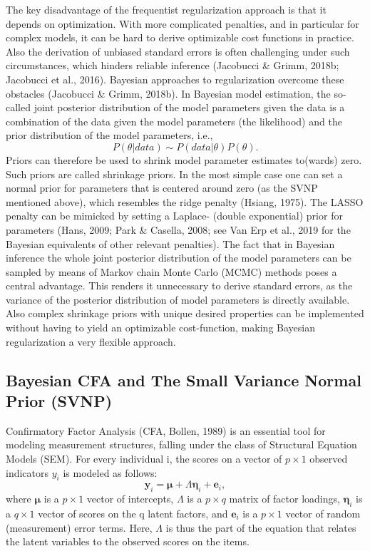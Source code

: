 \documentclass[
  man, donotrepeattitle,floatsintext]{apa6}
\begin{document}
The key disadvantage of the frequentist regularization approach is that
it depends on optimization. With more complicated penalties, and in
particular for complex models, it can be hard to derive optimizable cost
functions in practice. Also the derivation of unbiased standard errors
is often challenging under such circumstances, which hinders reliable
inference (Jacobucci \& Grimm, 2018b; Jacobucci et al., 2016).
Bayesian approaches to regularization overcome these obstacles
(Jacobucci \& Grimm, 2018b). In Bayesian model estimation, the
so-called joint posterior distribution of the model parameters given the
data is a combination of the data given the model parameters (the
likelihood) and the prior distribution of the model parameters, i.e.,
\[P({\theta} | data) \sim  P(data | \theta) P(\theta) .\] Priors can
therefore be used to shrink model parameter estimates to(wards) zero.
Such priors are called shrinkage priors. In the most simple case one can
set a normal prior for parameters that is centered around zero (as the
SVNP mentioned above), which resembles the ridge penalty
(Hsiang, 1975). The LASSO penalty can be mimicked by setting a
Laplace- (double exponential) prior for parameters (Hans, 2009; Park \& Casella, 2008; see Van Erp et al., 2019 for the Bayesian
equivalents of other relevant penalties). The fact that in Bayesian
inference the whole joint posterior distribution of the model parameters
can be sampled by means of Markov chain Monte Carlo (MCMC) methods poses
a central advantage. This renders it unnecessary to derive standard
errors, as the variance of the posterior distribution of model
parameters is directly available. Also complex shrinkage priors with
unique desired properties can be implemented without having to yield an
optimizable cost-function, making Bayesian regularization a very
flexible approach.

\hypertarget{bayesian-cfa-and-the-small-variance-normal-prior-svnp}{%
\subsection{Bayesian CFA and The Small Variance Normal Prior (SVNP)}\label{bayesian-cfa-and-the-small-variance-normal-prior-svnp}}

Confirmatory Factor Analysis (CFA, Bollen, 1989) is an
essential tool for modeling measurement structures, falling under the
class of Structural Equation Models (SEM). For every individual i, the
scores on a vector of \(p \times 1\) observed indicators \(y_i\) is modeled
as follows:
\[\boldsymbol{y}_i = \boldsymbol{\mu} + \Lambda \boldsymbol{\eta}_i + \boldsymbol{e}_i ,\]
where \(\boldsymbol{\mu}\) is a \(p \times 1\) vector of intercepts,
\(\Lambda\) is a \(p \times q\) matrix of factor loadings,
\(\boldsymbol{\eta}_i\) is a \(q \times 1\) vector of scores on the q latent
factors, and \(\boldsymbol{e}_i\) is a \(p \times 1\) vector of random
(measurement) error terms. Here, \(\Lambda\) is thus the part of the
equation that relates the latent variables to the observed scores on the
items.
\end{document}
